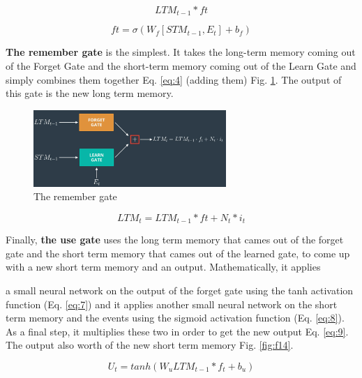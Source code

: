 \documentclass{article}
\begin{document}
\begin{equation}
LTM_{t-1} * ft
\label{eq:2}
\end{equation}


\begin{equation}
ft = \sigma(W_f[STM_{t-1}, E_t] + b_f)
\label{eq:3}
\end{equation}

\textbf{The remember gate} is the simplest. It takes the long-term memory coming out of the Forget Gate and the short-term memory coming out of the Learn Gate and simply combines them together Eq. \eqref{eq:4} (adding them) Fig. \ref{fig:f12}. The output of this gate is the new long term memory.


\begin{figure}[ht]
    \centering
    \includegraphics[width=0.65\textwidth,height=0.65\textheight,keepaspectratio]{images/remember_gate.png}
    \captionsetup{justification=centering}
    \caption{The remember gate}
    \label{fig:f12}
\end{figure}

\begin{equation}
LTM_t = LTM_{t-1} * ft + N_t * i_t
\label{eq:4}
\end{equation}

Finally, \textbf{the use gate} uses the long term memory that cames out of the forget gate and the short term memory that cames out of the learned gate, to come up with a new short term memory and an output. Mathematically, it applies

a small neural network on the output of the forget gate using the tanh activation function (Eq. \eqref{eq:7}) and it applies another small neural network on the short term memory and the events using the sigmoid activation function (Eq. \eqref{eq:8}). As a final step, it multiplies these two in order to get the new output Eq. \eqref{eq:9}. The output also worth of the new short term memory Fig. \ref{fig:f14}.

\begin{equation}
U_t = tanh(W_u LTM_{t-1} * f_t + b_u) 
\label{eq:7}
\end{equation}
\end{document}
